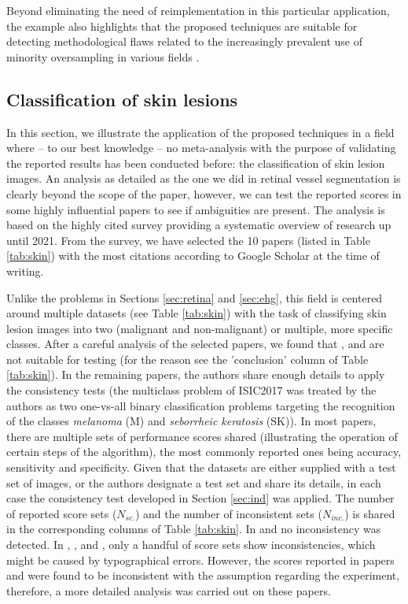 \documentclass[3p, times]{elsarticle}
\begin{document}
Beyond eliminating the need of reimplementation in this particular application, the example also highlights that the proposed techniques are suitable for detecting methodological flaws related to the increasingly prevalent use of minority oversampling in various fields \cite{smote}.

\subsection{Classification of skin lesions}
\label{sec:third}

In this section, we illustrate the application of the proposed techniques in a field where -- to our best knowledge -- no meta-analysis with the purpose of validating the reported results has been conducted before: the classification of skin lesion images. An analysis as detailed as the one we did in retinal vessel segmentation \cite{vessel} is clearly beyond the scope of the paper, however, we can test the reported scores in some highly influential papers to see if ambiguities are present. The analysis is based on the highly cited survey \cite{skinsurvey} providing a systematic overview of research up until 2021. From the survey, we have selected the 10 papers (listed in Table \ref{tab:skin}) with the most citations according to Google Scholar at the time of writing.

Unlike the problems in Sections \ref{sec:retina} and \ref{sec:ehg}, this field is centered around multiple datasets (see Table \ref{tab:skin}) with the task of classifying skin lesion images into two (malignant and non-malignant) or multiple, more specific classes. After a careful analysis of the selected papers, we found that \cite{skin1}, \cite{skin4} and \cite{skin6} are not suitable for testing (for the reason see the 'conclusion' column of Table \ref{tab:skin}). In the remaining papers, the authors share enough details to apply the consistency tests (the multiclass problem of ISIC2017 \cite{isic2017} was treated by the authors as two one-vs-all binary classification problems targeting the recognition of the classes \emph{melanoma} (M) and \emph{seborrheic keratosis} (SK)). In most papers, there are multiple sets of performance scores shared (illustrating the operation of certain steps of the algorithm), the most commonly reported ones being accuracy, sensitivity and specificity. Given that the datasets are either supplied with a test set of images, or the authors designate a test set and share its details, in each case the consistency test developed in Section \ref{sec:ind} was applied. The number of reported score sets ($N_{sc.}$) and the number of inconsistent sets ($N_{inc.}$) is shared in the corresponding columns of Table \ref{tab:skin}. In \cite{skin5} and \cite{skin8} no inconsistency was detected. In \cite{skin0}, \cite{skin2}, and \cite{skin3}, only a handful of score sets show inconsistencies, which might be caused by typographical errors. However, the scores reported in papers \cite{skin7} and \cite{skin9} were found to be inconsistent with the assumption regarding the experiment, therefore, a more detailed analysis was carried out on these papers.
\end{document}
